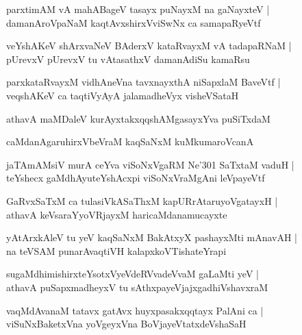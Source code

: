 \documentclass[twoside,12pt,openright]{book}
\newcounter{shloka}[chapter]
\begin{document}
\begin{shloka}%
parxtimAM vA mahABageV tasayx puNayxM na gaNayxteV |\\
damanAroVpaNaM kaqtAvxshirxVviSwNx ca samapaRyeVtf 
\end{shloka}

\begin{shloka}%
veYshAKeV shArxvaNeV BAderxV kataRvayxM vA tadapaRNaM |\\
pUrevxV pUrevxV tu vAtasathxV damanAdiSu kamaRsu
\end{shloka}

\begin{shloka}%
parxkataRvayxM vidhAneVna tavxnayxthA niSapxlaM BaveVtf |\\
veqshAKeV ca taqtiVyAyA jalamadheVyx visheVSataH 
\end{shloka}

\begin{shloka}%
athavA maMDaleV kurAyxtakxqqshAMgasayxYva puSiTxdaM 
\end{shloka}

\begin{shloka}%
caMdanAgaruhirxVbeVraM kaqSaNxM kuMkumaroVcanA
\end{shloka}

\begin{shloka}%
jaTAmAMsiV murA ceYva viSoNxVgaRM Ne\char'301 SaTxtaM vaduH |\\
teYshecx gaMdhAyuteYshAcxpi viSoNxVraMgAni leVpayeVtf 
\end{shloka}

\begin{shloka}%
GaRvxSaTxM ca tulasiVkASaThxM kapURrAtaruyoVgatayxH |\\
athavA keVsaraYyoVRjayxM haricaMdanamucayxte
\end{shloka}

\begin{shloka}%
yAtArxkAleV tu yeV kaqSaNxM BakAtxyX pashayxMti mAnavAH |\\
na teVSAM punarAvaqtiVH kalapxkoVTishateYrapi
\end{shloka}

\begin{shloka}%
sugaMdhimishirxteYsotxVyeVdeRVvadeVvaM gaLaMti yeV |\\
athavA puSapxmadheyxV tu sAthxpayeVjajxgadhiVshavxraM 
\end{shloka}

\begin{shloka}%
vaqMdAvanaM tatavx gatAvx huyxpasakxqqtayx PalAni ca |\\
viSuNxBaketxVna yoVgeyxVna BoVjayeVtatxdeVshaSaH 
\end{shloka}
\end{document}
